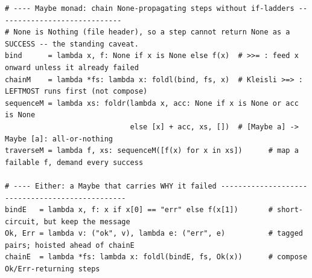 \documentclass[10pt,letterpaper]{book}
\begin{document}
\begin{lstlisting}[style=file]
# ---- Maybe monad: chain None-propagating steps without if-ladders -----------------------------
# None is Nothing (file header), so a step cannot return None as a SUCCESS -- the standing caveat.
bind      = lambda x, f: None if x is None else f(x)  # >>= : feed x onward unless it already failed
chainM    = lambda *fs: lambda x: foldl(bind, fs, x)  # Kleisli >=> : LEFTMOST runs first (not compose)
sequenceM = lambda xs: foldr(lambda x, acc: None if x is None or acc is None
                             else [x] + acc, xs, [])  # [Maybe a] -> Maybe [a]: all-or-nothing
traverseM = lambda f, xs: sequenceM([f(x) for x in xs])      # map a failable f, demand every success

# ---- Either: a Maybe that carries WHY it failed ------------------------------------------------
bindE   = lambda x, f: x if x[0] == "err" else f(x[1])       # short-circuit, but keep the message
Ok, Err = lambda v: ("ok", v), lambda e: ("err", e)          # tagged pairs; hoisted ahead of chainE
chainE  = lambda *fs: lambda x: foldl(bindE, fs, Ok(x))      # compose Ok/Err-returning steps

\end{lstlisting}
\backmatter
\end{document}
